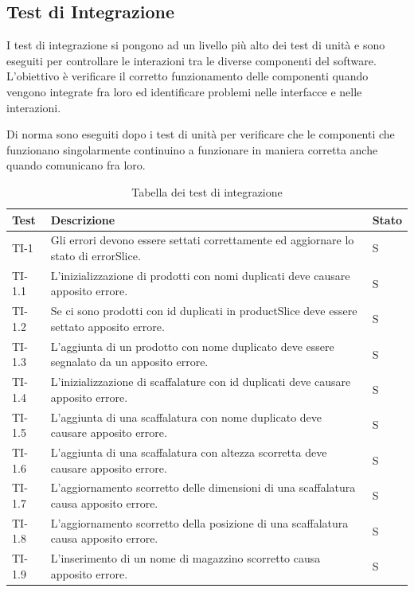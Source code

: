 \subsection{Test di Integrazione}
\par I test di integrazione si pongono ad un livello più alto dei test di unità e sono eseguiti per controllare le interazioni tra le diverse componenti del software. L'obiettivo è verificare il corretto funzionamento delle componenti quando vengono integrate fra loro ed identificare problemi nelle interfacce e nelle interazioni.
\par Di norma sono eseguiti dopo i test di unità per verificare che le componenti che funzionano singolarmente continuino a funzionare in maniera corretta anche quando comunicano fra loro.
\renewcommand{\arraystretch}{1.5}
\begin{xltabular}{0.9\textwidth}{X | p{0.6\textwidth}  | p{0.1\textwidth}}
    \textbf{\color{white} Test} & \textbf{\color{white} Descrizione} & \textbf{\color{white} Stato}\\ 
    \hline
    \endhead
    \caption{Tabella dei test di integrazione} 
    \label{tab:test_sistema}
    \endlastfoot
    TI-1 & Gli errori devono essere settati correttamente ed aggiornare lo stato di errorSlice. & S\\
    TI-1.1 & L'inizializzazione di prodotti con nomi duplicati deve causare apposito errore. & S\\
    TI-1.2 & Se ci sono prodotti con id duplicati in productSlice deve essere settato apposito errore. & S\\
    TI-1.3 & L'aggiunta di un prodotto con nome duplicato deve essere segnalato da un apposito errore. & S\\
    TI-1.4 & L'inizializzazione di scaffalature con id duplicati deve causare apposito errore. & S\\
    TI-1.5 & L'aggiunta di una scaffalatura con nome duplicato deve causare apposito errore. & S\\
    TI-1.6 & L'aggiunta di una scaffalatura con altezza scorretta deve causare apposito errore. & S\\
    TI-1.7 & L'aggiornamento scorretto delle dimensioni di una scaffalatura causa apposito errore. & S\\
    TI-1.8 & L'aggiornamento scorretto della posizione di una scaffalatura causa apposito errore. & S\\
    TI-1.9 & L'inserimento di un nome di magazzino scorretto causa apposito errore. & S\\

\end{xltabular}
